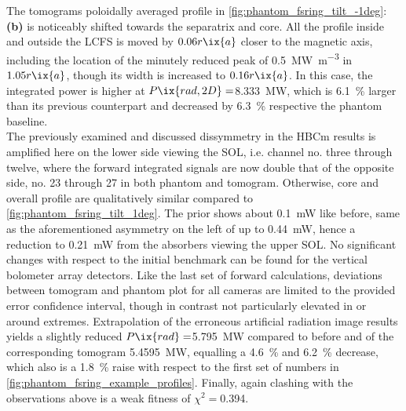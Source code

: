             The tomograms poloidally averaged profile in \cref{fig:phantom_fsring_tilt_-1deg}:\textbf{(b)} is noticeably shifted towards the separatrix and core. All the profile inside and outside the LCFS is moved by $0.06r\ix{a}$ closer to the magnetic axis, including the location of the minutely reduced peak of \SI{0.5}{\mega\watt\per\cubic\meter} in $1.05r\ix{a}$, though its width is increased to $0.16r\ix{a}$. In this case, the integrated power is higher at $P\ix{rad,2D}=$\SI{8.333}{\mega\watt}, which is \SI{6.1}{\percent} larger than its previous counterpart and decreased by \SI{6.3}{\percent} respective the phantom baseline.\\%
            The previously examined and discussed dissymmetry in the HBCm results is amplified here on the lower side viewing the SOL, i.e. channel no. three through twelve, where the forward integrated signals are now double that of the opposite side, no. 23 through 27 in both phantom and tomogram. Otherwise, core and overall profile are qualitatively similar compared to \cref{fig:phantom_fsring_tilt_1deg}. The prior shows about \SI{0.1}{\milli\watt} like before, same as the aforementioned asymmetry on the left of up to \SI{.44}{\milli\watt}, hence a reduction to \SI{0.21}{\milli\watt} from the absorbers viewing the upper SOL. No significant changes with respect to the initial benchmark can be found for the vertical bolometer array detectors. Like the last set of forward calculations, deviations between tomogram and phantom plot for all cameras are limited to the provided error confidence interval, though in contrast not particularly elevated in or around extremes. Extrapolation of the erroneous artificial radiation image results yields a slightly reduced $P\ix{rad}=$\SI{5.795}{\mega\watt} compared to before and of the corresponding tomogram \SI{5.4595}{\mega\watt}, equalling a \SI{4.6}{\percent} and \SI{6.2}{\percent} decrease, which also is a \SI{1.8}{\percent} raise with respect to the first set of numbers in \cref{fig:phantom_fsring_example_profiles}. Finally, again clashing with the observations above is a weak fitness of $\chi^{2}=$\SI{0.394}{\arbitraryunit}.\\%
